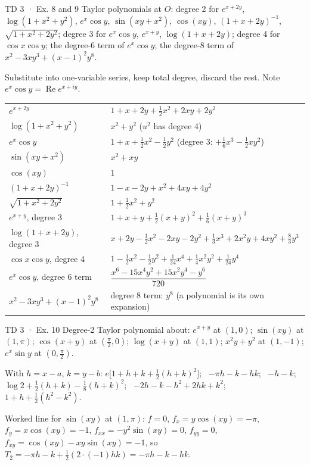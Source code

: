 \begin{problem}{TD 3 · Ex. 8 and 9}
Taylor polynomials at $O$: degree 2 for $e^{x+2y}$, $\log(1+x^2+y^2)$, $e^x\cos y$,
$\sin(xy+x^2)$, $\cos(xy)$, $(1+x+2y)^{-1}$, $\sqrt{1+x^2+2y^2}$; degree 3 for $e^x\cos y$,
$e^{x+y}$, $\log(1+x+2y)$; degree 4 for $\cos x\cos y$; the degree-6 term of $e^x\cos y$; the
degree-8 term of $x^2-3xy^3+(x-1)^2y^8$.
\end{problem}
\begin{hint}Substitute into one-variable series, keep total degree, discard the rest. Note
$e^x\cos y=\operatorname{Re}e^{x+iy}$.\end{hint}
\begin{solution}
\begin{center}\small
\begin{tabularx}{\linewidth}{@{}l Y@{}}
\toprule
$e^{x+2y}$ & $1+x+2y+\tfrac12x^2+2xy+2y^2$\\
$\log(1+x^2+y^2)$ & $x^2+y^2$ \quad ($u^2$ has degree 4)\\
$e^x\cos y$ & $1+x+\tfrac12x^2-\tfrac12y^2$ \quad (degree 3: $+\tfrac16x^3-\tfrac12xy^2$)\\
$\sin(xy+x^2)$ & $x^2+xy$\\
$\cos(xy)$ & $1$\\
$(1+x+2y)^{-1}$ & $1-x-2y+x^2+4xy+4y^2$\\
$\sqrt{1+x^2+2y^2}$ & $1+\tfrac12x^2+y^2$\\
$e^{x+y}$, degree 3 & $1+x+y+\tfrac12(x+y)^2+\tfrac16(x+y)^3$\\
$\log(1+x+2y)$, degree 3 & $x+2y-\tfrac12x^2-2xy-2y^2+\tfrac13x^3+2x^2y+4xy^2+\tfrac83y^3$\\
$\cos x\cos y$, degree 4 & $1-\tfrac12x^2-\tfrac12y^2+\tfrac1{24}x^4+\tfrac14x^2y^2+\tfrac1{24}y^4$\\
$e^x\cos y$, degree 6 term & $\dfrac{x^6-15x^4y^2+15x^2y^4-y^6}{720}$\\
$x^2-3xy^3+(x-1)^2y^8$ & degree 8 term: $y^8$ (a polynomial is its own expansion)\\
\bottomrule
\end{tabularx}
\end{center}
\end{solution}

\begin{problem}{TD 3 · Ex. 10}
Degree-2 Taylor polynomial about: $e^{x+y}$ at $(1,0)$; $\sin(xy)$ at $(1,\pi)$; $\cos(x+y)$ at
$(\frac\pi2,0)$; $\log(x+y)$ at $(1,1)$; $x^2y+y^2$ at $(1,-1)$; $e^x\sin y$ at $(0,\frac\pi2)$.
\end{problem}
\begin{solution}
With $h=x-a$, $k=y-b$:
$e\big[1+h+k+\tfrac12(h+k)^2\big]$; \ $-\pi h-k-hk$; \ $-h-k$; \
$\log2+\tfrac12(h+k)-\tfrac18(h+k)^2$; \ $-2h-k-h^2+2hk+k^2$; \ $1+h+\tfrac12(h^2-k^2)$.

Worked line for $\sin(xy)$ at $(1,\pi)$: $f=0$, $f_x=y\cos(xy)=-\pi$, $f_y=x\cos(xy)=-1$,
$f_{xx}=-y^2\sin(xy)=0$, $f_{yy}=0$, $f_{xy}=\cos(xy)-xy\sin(xy)=-1$, so
$T_2=-\pi h-k+\tfrac12(2\cdot(-1)hk)=-\pi h-k-hk$.
\end{solution}

